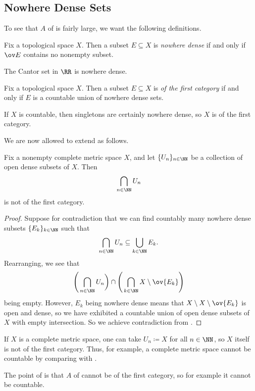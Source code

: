 \documentclass[../notes.tex]{subfiles}
\begin{document}
\subsection{Nowhere Dense Sets}
To see that $A$ of  is fairly large, we want the following definitions.
\begin{definition}
	Fix a topological space $X$. Then a subset $E\subseteq X$ is \textit{nowhere dense} if and only if $\ov E$ contains no nonempty subset.
\end{definition}
\begin{example}
	The Cantor set in $\RR$ is nowhere dense.
\end{example}
\begin{definition}[category]
	Fix a topological space $X$. Then a subset $E\subseteq X$ is \textit{of the first category} if and only if $E$ is a countable union of nowhere dense sets.
\end{definition}
\begin{example} \label{ex:countable-first-cat}
	If $X$ is countable, then singletons are certainly nowhere dense, so $X$ is of the first category.
\end{example}
We are now allowed to extend  as follows.
\begin{theorem}[Baire] \label{thm:baire-2}
	Fix a nonempty complete metric space $X$, and let $\{U_n\}_{n\in\NN}$ be a collection of open dense subsets of $X$. Then
	\[\bigcap_{n\in\NN}U_n\]
	is not of the first category.
\end{theorem}
\begin{proof}
	Suppose for contradiction that we can find countably many nowhere dense subsets $\{E_k\}_{k\in\NN}$ such that
	\[\bigcap_{n\in\NN}U_n\subseteq\bigcup_{k\in\NN}E_k.\]
	Rearranging, we see that
	\[\Bigg(\bigcap_{n\in\NN}U_n\bigg)\cap\Bigg(\bigcap_{k\in\NN}X\setminus\ov{E_k}\Bigg)\]
	being empty. However, $E_k$ being nowhere dense means that $X\setminus X\setminus\ov{E_k}$ is open and dense, so we have exhibited a countable union of open dense subsets of $X$ with empty intersection. So we achieve contradiction from .
\end{proof}
\begin{example}
	If $X$ is a complete metric space, one can take $U_n\coloneqq X$ for all $n\in\NN$, so $X$ itself is not of the first category. Thus, for example, a complete metric space cannot be countable by comparing with .
\end{example}
The point of  is that $A$ of  cannot be of the first category, so for example it cannot be countable.
\end{document}
